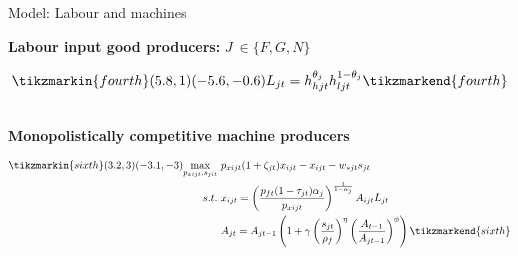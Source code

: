 \documentclass[11pt,aspectratio=169]{beamer}
\begin{document}
\begin{frame}{Model: Labour and machines}
	
	\textbf{Labour input good producers:} $J\ \in\{F,G,N\}$\\ \vspace{3mm}
	\begin{minipage}[t!]{1\textwidth}
		\begin{align*}
		\tikzmarkin{fourth}(5.8,1)(-5.6,-0.6)
		 L_{jt}=h_{hjt}^{\theta_{j}}h_{ljt}^{1-\theta_{j}}
		\tikzmarkend{fourth}
		\end{align*}
	\end{minipage}
\\

\vspace{10mm}
	\textbf{Monopolistically competitive machine producers }\\ \vspace{-1mm}
\begin{minipage}[t!]{1\textwidth}
	\begin{align*}
	\tikzmarkin{sixth}(3.2,3)(-3.1,-3)
\underset{p_{xijt}, s_{jit}}{\max}\ & p_{xijt}(1+\zeta_{jt})x_{ijt}-x_{ijt}-w_{sjt}s_{jt}\\
s.t.\ & x_{ijt}= \left(\frac{p_{ft}(1-\tau_{jt})\alpha_j}{p_{xijt}}\right)^\frac{1}{1-\alpha_j}A_{ijt}L_{jt}\\
& A_{jt}=A_{jt-1}\left(1+\gamma\left(\frac{s_{jt}}{\rho_f}\right)^\eta\left(\frac{A_{t-1}}{A_{jt-1}}\right)^\phi\right)
	\tikzmarkend{sixth}
	\end{align*}
\end{minipage}
\end{frame}
%
\end{document}
